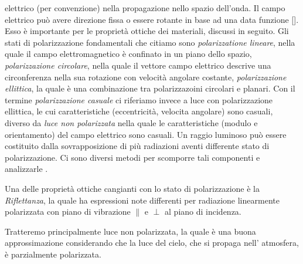 elettrico (per convenzione) nella propagazione nello spazio dell'onda. Il campo elettrico pu\`o avere direzione fissa o essere rotante in base ad una
data funzione [\cite{rad-phot}]. Esso \`e importante per le propriet\`a ottiche dei materiali, discussi in seguito. Gli stati di polarizzazione 
fondamentali che citiamo sono \textit{polarizzatione lineare}, nella quale il campo elettromagnetico \`e confinato in un piano dello spazio, 
\textit{polarizzazione circolare}, nella quale il vettore campo elettrico descrive una circonferenza nella sua rotazione con velocit\`a angolare 
costante, \textit{polarizzazione ellittica}, la quale \`e una combinazione tra polarizzazoini circolari e planari. Con il termine 
\textit{polarizzazione casuale} ci riferiamo invece a luce con polarizzazione ellittica, le cui caratteristiche (eccentricit\`a, velocita angolare) 
sono casuali, diverso da \textit{luce non polarizzata} nella quale le caratteristiche (modulo e orientamento) del campo elettrico sono casuali.
Un raggio luminoso pu\`o essere costituito dalla sovrapposizione di pi\`u radiazioni aventi differente stato di polarizzazione. Ci sono diversi metodi 
per scomporre tali componenti e analizzarle \cite{hecht}.\par
Una delle propriet\`a ottiche cangianti con lo stato di polarizzazione \`e la \textit{Riflettanza}, la quale ha espressioni note differenti per 
radiazione linearmente polarizzata con piano di vibrazione $\parallel$ e $\perp$ al piano di incidenza.\par
Tratteremo principalmente luce non polarizzata, la quale \`e una buona approssimazione considerando che la luce del cielo, che si propaga nell'
atmosfera, \`e parzialmente polarizzata.
%
